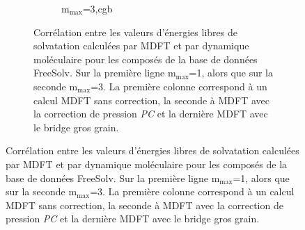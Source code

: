 \begin{figure}
\begin{figure}[H]
\begin{subfigure}[b]{0.30\textwidth}
{}
       \label{fig:correlation_avec_sans_cgb:mmax3_pc}
    \end{subfigure}
   \begin{subfigure}[b]{0.30\textwidth}
       \centering
       \caption{$\mathrm{m}_\mathrm{max}$=3,cgb}
       \label{fig:correlation_avec_sans_cgb:mmax3_cgb}
    \end{subfigure}
    
    
  \caption[Corrélation entre les valeurs d'énergies libres de solvatation calculées par MDFT et par dynamique moléculaire pour les composés de la base de données FreeSolv.]{Corrélation entre les valeurs d'énergies libres de solvatation calculées par MDFT et par dynamique moléculaire pour les composés de la base de données FreeSolv. Sur la première ligne $\mathrm{m}_\mathrm{max}$=1, alors que sur la seconde $\mathrm{m}_\mathrm{max}$=3. La première colonne correspond à un calcul MDFT sans correction, la seconde à MDFT avec la correction de pression \textit{PC} et la dernière MDFT avec le bridge gros grain.}
  \label{fig:correlation_avec_sans_cgb}
\end{figure}
\end{figure}


